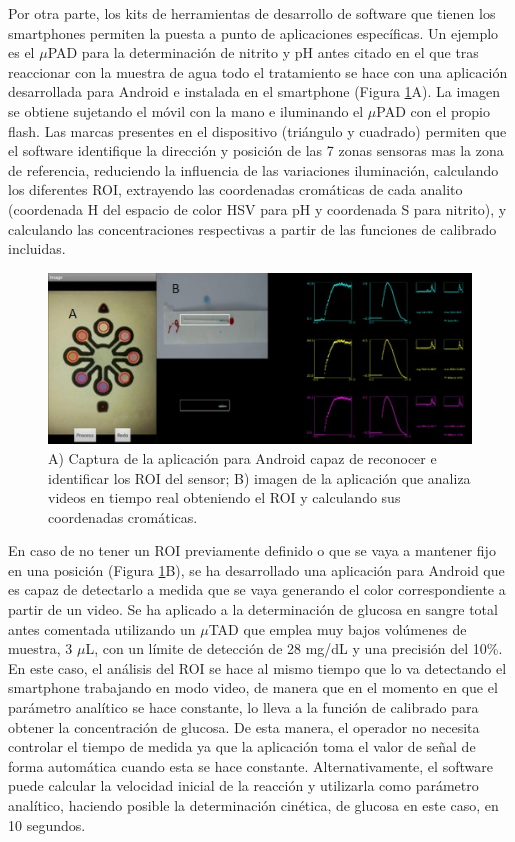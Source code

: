 \documentclass{article}
\begin{document}
Por otra parte, los kits de herramientas de desarrollo de software que tienen los smartphones permiten la puesta a punto de aplicaciones específicas. Un ejemplo es el $\mu$PAD para la determinación de nitrito y pH antes citado\cite{Lopez-Ruiz2014} en el que tras reaccionar con la muestra de agua todo el tratamiento se hace con una aplicación desarrollada para Android  e instalada en el smartphone (Figura \ref{fig:app}A). La imagen se obtiene sujetando el móvil con la mano e iluminando el $\mu$PAD con el propio flash. Las marcas presentes en el dispositivo (triángulo y cuadrado) permiten que el software identifique la dirección y posición de las 7 zonas sensoras mas la zona de referencia, reduciendo la influencia de las variaciones iluminación, calculando los diferentes ROI, extrayendo las coordenadas cromáticas de cada analito (coordenada H del espacio de color HSV para pH y coordenada S para nitrito), y calculando las concentraciones respectivas a partir de las funciones de calibrado incluidas.\\

\begin{figure}[h]
	\includegraphics[width=\textwidth]{app}
	\caption{A) Captura de la aplicación para Android capaz de reconocer e identificar los ROI del sensor; B) imagen de la aplicación que analiza videos en tiempo real obteniendo el ROI y calculando sus coordenadas cromáticas.}
	\label{fig:app}
\end{figure}

En caso de no tener un ROI previamente definido o que se vaya a mantener fijo en una posición (Figura \ref{fig:app}B), se ha desarrollado una aplicación para Android que es capaz de detectarlo a medida que se vaya generando el color correspondiente a partir de un video. Se ha aplicado a la determinación de glucosa en sangre total antes comentada utilizando un $\mu$TAD que emplea muy bajos volúmenes de muestra, 3 $\mu$L, con un límite de detección de 28 mg/dL y una precisión del 10\%. En este caso, el análisis del ROI se hace al mismo tiempo que lo va detectando el smartphone trabajando en modo video, de manera que en el momento en que el parámetro analítico se hace constante, lo lleva a la función de calibrado para obtener la concentración de glucosa. De esta manera, el operador no necesita controlar el tiempo de medida ya que la aplicación toma el valor de señal de forma automática cuando esta se hace constante. Alternativamente, el software puede calcular la velocidad inicial de la reacción y utilizarla como parámetro analítico, haciendo posible la determinación cinética, de glucosa en este caso, en 10 segundos.











	
\end{document}
